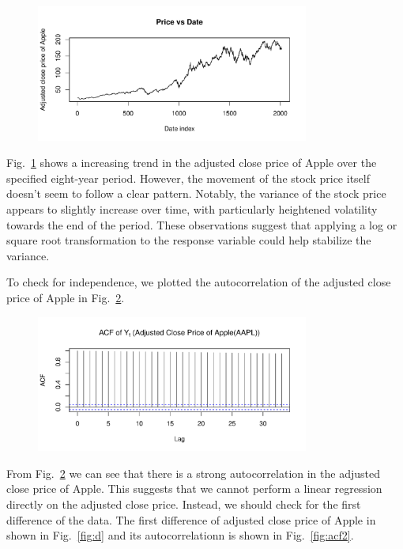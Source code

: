 \documentclass[conference,onecolumn,11pt]{IEEEtran}
\begin{document}
\begin{figure}[htpb]
	\centering
	\includegraphics[width=0.8\textwidth]{pic/Price_vs_Date.pdf}
	\caption{}
	\label{fig:price}
\end{figure}

Fig.~\ref{fig:price} shows a increasing trend in the adjusted close price of Apple over the specified eight-year period. However, the movement of the stock price itself doesn't seem to follow a clear pattern. Notably, the variance of the stock price appears to slightly increase over time, with particularly heightened volatility towards the end of the period. These observations suggest that applying a log or square root transformation to the response variable could help stabilize the variance. 

To check for independence, we plotted the autocorrelation of the adjusted close price of Apple in Fig.~\ref{fig:acf1}.

\begin{figure}[htpb]
	\centering
	\includegraphics[width=0.8\textwidth]{pic/ACF_AdjClosed.pdf}
	\caption{}
	\label{fig:acf1}
\end{figure}

From Fig.~\ref{fig:acf1} we can see that there is a strong autocorrelation in the adjusted close price of Apple. This suggests that we cannot perform a linear regression directly on the adjusted close price. Instead, we should check for the first difference of the data. The first difference of adjusted close price of Apple in shown in Fig.~\ref{fig:d} and its autocorrelationn is shown in Fig.~\ref{fig:acf2}.
\end{document}
